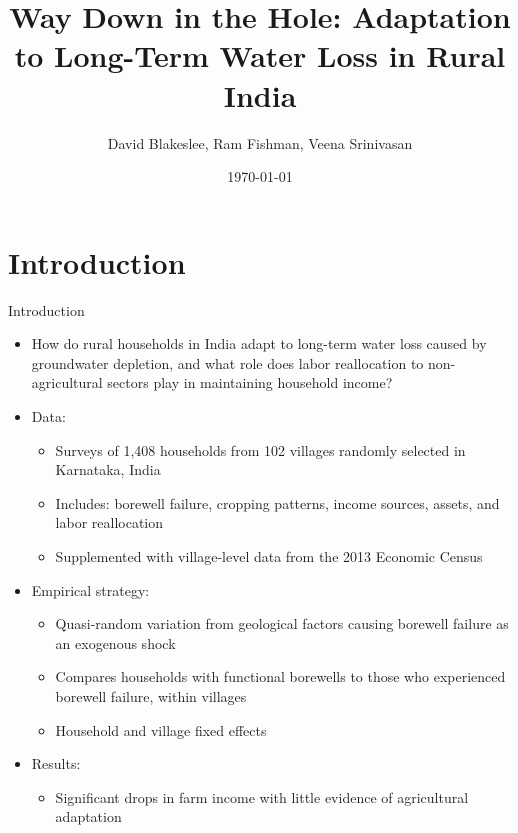 \documentclass[10pt]{beamer}
\title[]{Way Down in the Hole: Adaptation to Long-Term Water Loss in Rural India}
\author[]{David Blakeslee, Ram Fishman, Veena Srinivasan}
\date{\today}
\begin{document}

\begin{frame}[plain]
\end{frame}


\section{Introduction}
\begin{frame}
	{Introduction}
	\begin{itemize}
		\item How do rural households in India adapt to long-term water loss caused by groundwater depletion, and what role does labor reallocation to non-agricultural sectors play in maintaining household income?
		\item Data:
		      \begin{itemize}
			      \item Surveys of 1,408 households from 102 villages randomly selected in Karnataka, India
			      \item Includes: borewell failure, cropping patterns, income sources, assets, and labor reallocation
			      \item Supplemented with village-level data from the 2013 Economic Census
		      \end{itemize}
		\item Empirical strategy:
		      \begin{itemize}
			      \item Quasi-random variation from geological factors causing borewell failure as an exogenous shock
			      \item Compares households with functional borewells to those who experienced borewell failure, within villages
			      \item Household and village fixed effects
		      \end{itemize}
		\item Results:
		      \begin{itemize}
			      \item Significant drops in farm income with little evidence of agricultural adaptation

\end{itemize}
\end{itemize}
\end{frame}
\end{document}
